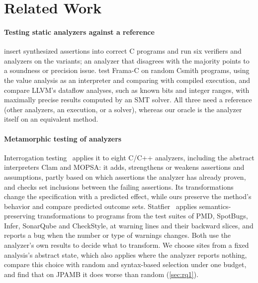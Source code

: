 \section{Related Work}
\label{sec:related}

\paragraph{Testing static analyzers against a reference}
\citet{klinger2019} insert synthesized assertions into correct C
programs and run six verifiers and analyzers on the variants; an analyzer that
disagrees with the majority points to a soundness or precision issue. \citet{cuoq2012} test Frama-C on random Csmith programs, using the value
analysis as an interpreter and comparing with compiled execution, and \citet{taneja2020} compare LLVM's dataflow analyses, such as known bits and
integer ranges, with maximally precise results computed by an SMT solver. All
three need a reference (other analyzers, an execution, or a solver), whereas
our oracle is the analyzer itself on an equivalent method.

\paragraph{Metamorphic testing of analyzers}
Interrogation testing~\citep{kaindlstorfer2024}
applies it to eight C/C++ analyzers, including the abstract interpreters Clam
and MOPSA: it adds,
strengthens or weakens assertions and assumptions, partly based on which
assertions the analyzer has already proven, and checks set inclusions between
the failing assertions. Its transformations change the specification with a
predicted effect, while ours preserve the method's behavior and compare
predicted outcome sets. Statfier~\citep{zhang2023statfier} applies
semantics-preserving transformations to programs from the test suites of PMD,
SpotBugs, Infer, SonarQube and CheckStyle, at warning lines and their backward
slices, and reports a bug when the number or type of warnings changes. Both
use the analyzer's own results to decide what to transform. We choose sites
from a fixed analysis's abstract state, which also applies where the analyzer
reports nothing, compare this choice with random and syntax-based selection
under one budget, and find that on JPAMB it does worse than random
(\cref{sec:rq1}).

